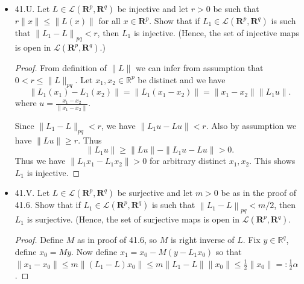 \begin{itemize}
(c) Let $\Omega \subseteq \mathbf{R}^p$ be open and $f: \Omega \rightarrow \mathbf{R}^p$ belong to Class $C^1(\Omega)$. If $D f(c)$ is invertible for some $c \in \Omega$, then $D f(x)$ is invertible on some neighborhood of $c$.
\begin{proof}
	Since $f \in C^1(\Omega)$, the mapping $x \mapsto Df(x)$ is continuous. Since $Df(c)$ is invertible, by $(b)$ the map $Df(x) \mapsto Df(x)^{-1}$ is continuous on some neighborhood $N$ of $Df(c)$. Since $x \mapsto Df(x)$ is continuous, the preimage of $N$ is a neighborhood $M$ of $c$ such that $Df(x)$ is invertible for $x \in M$.
\end{proof}

\item 41.U. Let $L \in \mathscr{L}\left(\boldsymbol{R}^p, \mathbf{R}^q\right)$ be injective and let $r>0$ be such that $r\|x\| \leq\|L(x)\|$ for all $x \in \mathbf{R}^p$. Show that if $L_1 \in \mathscr{L}\left(\mathbf{R}^p, \mathbf{R}^q\right)$ is such that $\left\|L_1-L\right\|_{p q}<r$, then $L_1$ is injective. (Hence, the set of injective maps is open in $\mathscr{L}\left(\boldsymbol{R}^p, \mathbf{R}^q\right)$.)
\begin{proof}
	From definition of $\|L\|$ we can infer from assumption that $0<r \le \|L\|_{pq}$.  Let $x_1, x_2  \in \mathbb{R}^p$ be distinct and we have
	\[
		\|L_1(x_1) - L_1(x_2)\|
		= \|L_1(x_1-x_2)\|
		=\|x_1-x_2\| \|L_1 u\|
		.
	\]
	where $u = \frac{x_1-x_2}{\|x_1-x_2\|}$.

Since $\|L_1 - L\|_{pq}<r$, we have $\|L_1 u - L u\|<r$. Also by assumption we have  $\|L u\| \ge  r$. Thus
\[
	\|L_1 u\| \ge \|L u\| - \|L_1 u - L u\| > 0
.\] 
Thus we have $\|L_1 x_1 - L_1 x_2\| >0$ for arbitrary distinct $x_1, x_2$. This shows $L_1$ is injective.
\end{proof}

\item 41.V. Let $L \in \mathscr{L}\left(\boldsymbol{R}^p, \mathbf{R}^q\right)$ be surjective and let $m>0$ be as in the proof of 41.6. Show that if $L_1 \in \mathscr{L}\left(\mathbf{R}^p, \mathbf{R}^q\right)$ is such that $\left\|L_1-L\right\|_{p q}<m / 2$, then $L_1$ is surjective. (Hence, the set of surjective maps is open in $\mathscr{L}\left(\boldsymbol{R}^p, \mathbf{R}^q\right)$.
\begin{proof}
	Define $M$ as in proof of 41.6, so $M$ is right inverse of $L$. Fix $y \in \mathbb{R}^q$, define $x_0 = M y$. Now define $x_1 = x_0 - M(y - L_1 x_0)$ so that $\|x_1 - x_0\|\le m\|\left( L_1 - L \right)  x_0\| \le m \|L_1 - L\| \|x_0\| \le \frac{1}{2} \|x_0\| =: \frac{1}{2} \alpha$.


\end{proof}
\end{itemize}
